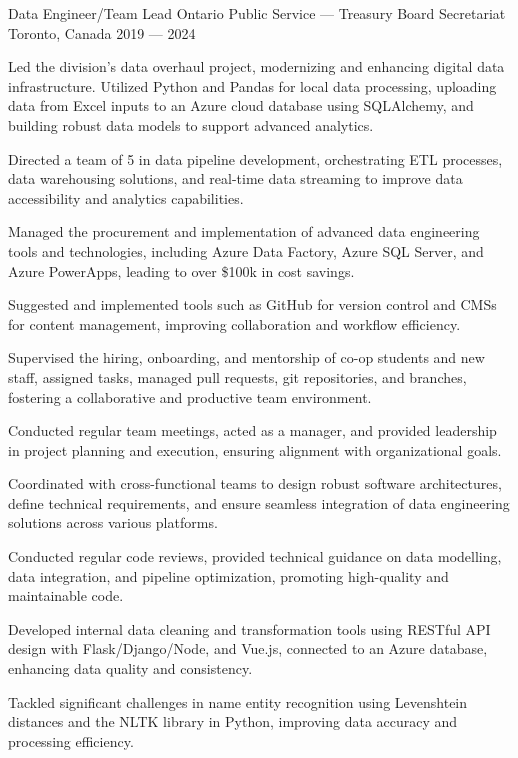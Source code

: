 \begin{cventries}
\cventry%
  {Data Engineer/Team Lead}
  {Ontario Public Service --- Treasury Board Secretariat}
  {Toronto, Canada}
  {2019 --- 2024}
  {
    \begin{cvitems}
      \item Led the division's data overhaul project, modernizing and enhancing digital data infrastructure. Utilized Python and Pandas for local data processing, uploading data from Excel inputs to an Azure cloud database using SQLAlchemy, and building robust data models to support advanced analytics.
      \item Directed a team of 5 in data pipeline development, orchestrating ETL processes, data warehousing solutions, and real-time data streaming to improve data accessibility and analytics capabilities.
      \item Managed the procurement and implementation of advanced data engineering tools and technologies, including Azure Data Factory, Azure SQL Server, and Azure PowerApps, leading to over \$100k in cost savings.
      \item Suggested and implemented tools such as GitHub for version control and CMSs for content management, improving collaboration and workflow efficiency.
      \item Supervised the hiring, onboarding, and mentorship of co-op students and new staff, assigned tasks, managed pull requests, git repositories, and branches, fostering a collaborative and productive team environment.
      \item Conducted regular team meetings, acted as a manager, and provided leadership in project planning and execution, ensuring alignment with organizational goals.
      \item Coordinated with cross-functional teams to design robust software architectures, define technical requirements, and ensure seamless integration of data engineering solutions across various platforms.
      \item Conducted regular code reviews, provided technical guidance on data modelling, data integration, and pipeline optimization, promoting high-quality and maintainable code.
      \item Developed internal data cleaning and transformation tools using RESTful API design with Flask/Django/Node, and Vue.js, connected to an Azure database, enhancing data quality and consistency.
      \item Tackled significant challenges in name entity recognition using Levenshtein distances and the NLTK library in Python, improving data accuracy and processing efficiency.
    \end{cvitems}
  }


\end{cventries}
